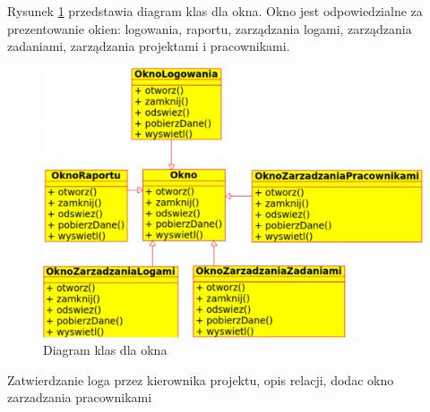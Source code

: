 Rysunek \ref{fig:OknoDiagramKlas} przedstawia diagram klas dla okna. 
Okno jest odpowiedzialne za prezentowanie okien: logowania, raportu, zarządzania logami, zarządzania zadaniami, zarządzania projektami i pracownikami.


\begin{figure}[h]
    \centering
    \includegraphics[scale=0.7]{diagramy/modelKlas/OknoDiagramKlas}
    \caption{Diagram klas dla okna}
    \label{fig:OknoDiagramKlas}
\end{figure}

Zatwierdzanie loga przez kierownika projektu, opis relacji, dodac okno zarzadzania pracownikami
